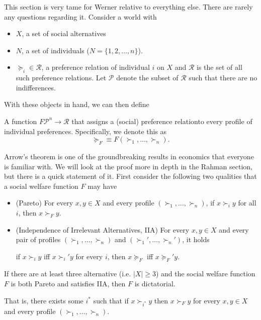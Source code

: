 \documentclass[11pt,english]{article}
\begin{document}
This section is very tame for Werner relative to everything else. There are rarely any questions regarding it. Consider a world with
\begin{itemize}
\item $X$, a set of social alternatives

\item $N$, a set of individuals ($N = \{1,2,\ldots, n\}$).

\item $\succeq_i\in \mathcal{R}$, a preference relation of individual $i$ on $X$ and $\mathcal{R}$ is the set of all such preference relations. Let $\mathcal{P}$ denote the subset of $\mathcal{R}$ such that there are no indifferences.
\end{itemize}
With these objects in hand, we can then define
\begin{definition}
A function $F\mathcal{P}^n\to \mathcal{R}$ that assigns a (social) preference relationto every profile of individual preferences. Specifically, we denote this as $$\succeq_F \equiv F(\succ_1, \ldots, \succ_n).$$
\end{definition}

Arrow's theorem is one of the groundbreaking results in economics that everyone is familiar with. We will look at the proof more in depth in the Rahman section, but there is a quick statement of it. First consider the following two qualities that a social welfare function $F$ may have
\begin{itemize}
\item (Pareto) For every $x,y\in X$ and every profile $(\succ_1, \ldots, \succ_n)$, if $x\succ_i y$ for all $i$, then $x\succ_F y$.

\item (Independence of Irrelevant Alternatives, IIA) For every $x,y\in X$ and every pair of profiles $(\succ_1, \ldots, \succ_n)$ and $(\succ_1', \ldots, \succ_n')$, it holds
\begin{center}
if $x \succ_i y$ iff $x\succ_i' y$ for every $i$, then $x\succeq_F$ iff $x\succeq_F' y.$
\end{center}
\end{itemize}
\begin{theorem}
If there are at least three alternative (i.e. $|X| \geq 3$) and the social welfare function $F$ is both Pareto and satisfies IIA, then $F$ is dictatorial.

That is, there exists some $i^*$ such that if $x\succ_{i^*} y$ then $x\succ_F y$ for every $x,y\in X$ and every profile $(\succ_1, \ldots, \succ_n)$.
\end{theorem}
\end{document}
